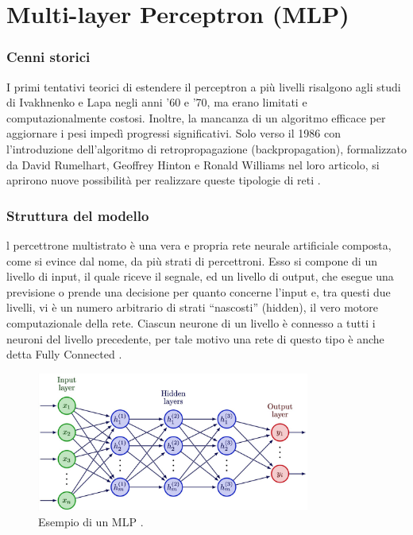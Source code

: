 \section{Multi-layer Perceptron (MLP)}
\label{sec:Multilayer_Perceptro_marker}
\subsubsection{Cenni storici}
I primi tentativi teorici di estendere il perceptron a più livelli 
risalgono agli studi di Ivakhnenko e Lapa negli anni '60 e '70, ma erano 
limitati e computazionalmente costosi. Inoltre, la mancanza di un algoritmo 
efficace per aggiornare i pesi impedì progressi significativi.
Solo verso il 1986 con l'introduzione dell'algoritmo di 
retropropagazione (backpropagation), formalizzato da David Rumelhart, 
Geoffrey Hinton e Ronald Williams nel loro articolo, si aprirono nuove 
possibilità per realizzare queste tipologie di reti \cite{Articolo_backpropagation}.


\subsubsection{Struttura del modello}
l percettrone multistrato è una vera e propria rete neurale artificiale 
composta, come si evince dal nome, da più strati di percettroni. Esso si compone di 
un livello di input, il quale riceve il segnale, ed un livello di output, che esegue 
una previsione o prende una decisione per quanto concerne l’input e, tra 
questi due livelli, vi è un numero arbitrario di strati “nascosti” (hidden), il vero motore 
computazionale della rete. Ciascun neurone di un livello è connesso a tutti i 
neuroni del livello precedente, per tale motivo una rete di questo tipo è anche 
detta Fully Connected 
\cite{ASPETTI_APPRENDIMENTO_PERCETTONE,GradientDescent_NeuralNetworks,ALL_DEEP_LEARNING}. 

\begin{figure}[H]
    \centering
    \includegraphics[width=0.8\textwidth]{Immagini/Generiche/MLP_v2.jpg}
    \caption{Esempio di un MLP \cite{Immagine_MLP}.}
    \label{fig:MLP_GRAPH3}
\end{figure}

